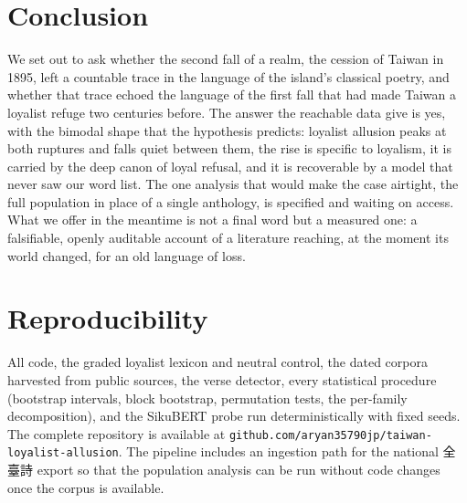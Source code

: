 \documentclass[10pt,twocolumn]{article}
\begin{document}
\section{Conclusion}
We set out to ask whether the second fall of a realm, the cession of Taiwan in 1895, left a
countable trace in the language of the island's classical poetry, and whether that trace
echoed the language of the first fall that had made Taiwan a loyalist refuge two centuries
before. The answer the reachable data give is yes, with the bimodal shape that the hypothesis
predicts: loyalist allusion peaks at both ruptures and falls quiet between them, the rise is
specific to loyalism, it is carried by the deep canon of loyal refusal, and it is recoverable
by a model that never saw our word list. The one analysis that would make the case airtight,
the full population in place of a single anthology, is specified and waiting on access. What we
offer in the meantime is not a final word but a measured one: a falsifiable, openly auditable
account of a literature reaching, at the moment its world changed, for an old language of loss.

\section*{Reproducibility}
All code, the graded loyalist lexicon and neutral control, the dated corpora harvested from
public sources, the verse detector, every statistical procedure (bootstrap intervals,
block bootstrap, permutation tests, the per-family decomposition), and the SikuBERT probe run
deterministically with fixed seeds. The complete repository is available at
\nolinkurl{github.com/aryan35790jp/taiwan-loyalist-allusion}.
The pipeline includes an ingestion path for the national
\mbox{全臺詩} export so that the population analysis can be run without code changes once the
corpus is available.
\end{document}
